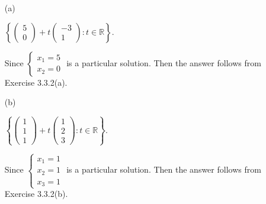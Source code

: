 \begin{Exercise}
	\begin{enumerate}[(a)]
		\item[(a)]
		\begin{answer}
			$\left\{\begin{pmatrix}
			5 \\
			0
			\end{pmatrix} + t\begin{pmatrix}
			-3 \\
			1
			\end{pmatrix} : t\in \mathbb{R} \right\}$.
		\end{answer}
		\begin{solution}
			Since $\begin{cases}
			x_1 = 5 \\
			x_2 = 0
			\end{cases}$ is a particular solution. Then the answer follows from Exercise 3.3.2(a).
		\end{solution}
		
		\item[(b)]
		\begin{answer}
			$\left\{\begin{pmatrix}
			1 \\
			1 \\
			1
			\end{pmatrix} + t\begin{pmatrix}
			1 \\
			2 \\
			3
			\end{pmatrix} : t\in \mathbb{R} \right\}$.
		\end{answer}
		\begin{solution}
			Since $\begin{cases}
			x_1 = 1 \\
			x_2 = 1 \\
			x_3 = 1
			\end{cases}$ is a particular solution. Then the answer follows from Exercise 3.3.2(b).
		\end{solution}
		
	\end{enumerate}
\end{Exercise}